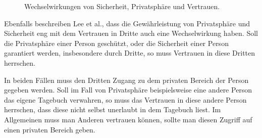 \begin{figure}
    \centering
    \caption{Wechselwirkungen von Sicherheit, Privatsphäre und Vertrauen.}
    \label{fig:02:secprivtru}
\end{figure}

Ebenfalls beschreiben Lee et al., dass die Gewährleistung von Privatsphäre und Sicherheit
eng mit dem Vertrauen in Dritte auch eine Wechselwirkung haben.\cite{lee_ethical_2016}
Soll die Privatsphäre einer Person geschützt, oder die Sicherheit einer Person garantiert werden, insbesondere durch Dritte,   
so muss Vertrauen in diese Dritten herrschen.

In beiden Fällen muss den Dritten Zugang zu dem privaten Bereich der Person gegeben werden.
Soll im Fall von Privatsphäre beispielsweise eine andere Person das eigene Tagebuch verwahren,
so muss das Vertrauen in diese andere Person herrschen, dass diese nicht selbst unerlaubt in dem Tagebuch liest.
Im Allgemeinen muss man Anderen vertrauen können, sollte man diesen Zugriff auf einen privaten Bereich geben. 

